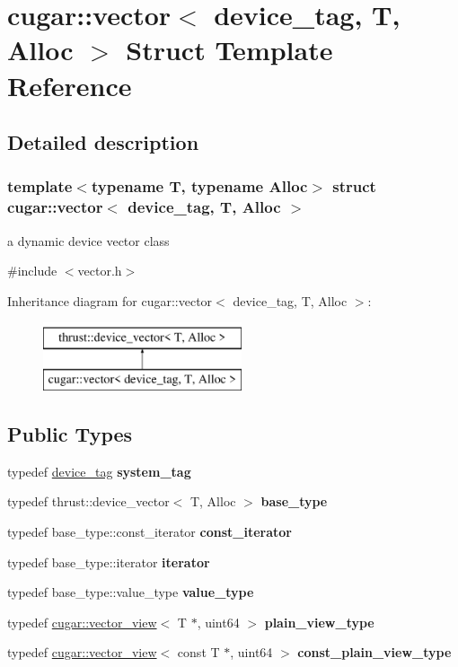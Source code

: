 \hypertarget{structcugar_1_1vector_3_01device__tag_00_01_t_00_01_alloc_01_4}{}\section{cugar\+:\+:vector$<$ device\+\_\+tag, T, Alloc $>$ Struct Template Reference}
\label{structcugar_1_1vector_3_01device__tag_00_01_t_00_01_alloc_01_4}


\subsection{Detailed description}
\subsubsection*{template$<$typename T, typename Alloc$>$\newline
struct cugar\+::vector$<$ device\+\_\+tag, T, Alloc $>$}

a dynamic device vector class 

{\ttfamily \#include $<$vector.\+h$>$}

Inheritance diagram for cugar\+:\+:vector$<$ device\+\_\+tag, T, Alloc $>$\+:\begin{figure}[H]
\begin{center}
\leavevmode
\includegraphics[height=2.000000cm]{structcugar_1_1vector_3_01device__tag_00_01_t_00_01_alloc_01_4}
\end{center}
\end{figure}
\subsection*{Public Types}
\begin{DoxyCompactItemize}
\item 
typedef \hyperlink{structcugar_1_1device__tag}{device\+\_\+tag} {\bfseries system\+\_\+tag}
\item 
typedef thrust\+::device\+\_\+vector$<$ T, Alloc $>$ {\bfseries base\+\_\+type}
\item 
typedef base\+\_\+type\+::const\+\_\+iterator {\bfseries const\+\_\+iterator}
\item 
typedef base\+\_\+type\+::iterator {\bfseries iterator}
\item 
typedef base\+\_\+type\+::value\+\_\+type {\bfseries value\+\_\+type}
\item 
typedef \hyperlink{structcugar_1_1vector__view}{cugar\+::vector\+\_\+view}$<$ T $\ast$, uint64 $>$ {\bfseries plain\+\_\+view\+\_\+type}
\item 
typedef \hyperlink{structcugar_1_1vector__view}{cugar\+::vector\+\_\+view}$<$ const T $\ast$, uint64 $>$ {\bfseries const\+\_\+plain\+\_\+view\+\_\+type}
\end{DoxyCompactItemize}
